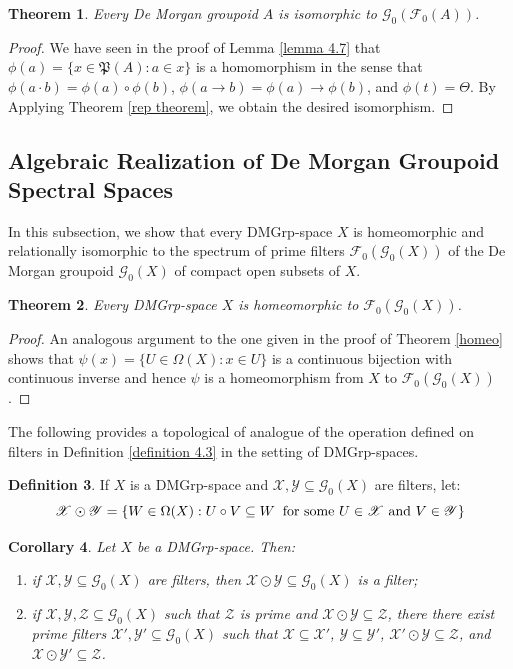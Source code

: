 \documentclass{amsart}
\theoremstyle{plain}
\newtheorem{theorem}{Theorem}[section]
\newtheorem{corollary}[theorem]{Corollary}
\theoremstyle{definition}
\newtheorem{definition}[theorem]{Definition}
\begin{document}
\begin{theorem}
    Every De Morgan groupoid $A$ is isomorphic to $\mathcal{G}_0(\mathcal{F}_0(A))$. 
\end{theorem}
\begin{proof}
    We have seen in the proof of Lemma \ref{lemma 4.7} that $\phi(a)=\{x\in\mathfrak{P}(A):a\in x\}$ is a homomorphism in the sense that
    $\phi(a\cdot b)=\phi(a)\circ\phi(b)$, $\phi(a\rightarrow b)=\phi(a)\rightarrow\phi(b)$, and $\phi(t)=\Theta$. By Applying Theorem \ref{rep theorem}, we obtain the desired isomorphism. 
\end{proof}
\subsection{Algebraic Realization of De Morgan Groupoid Spectral Spaces} In this subsection, we show that every DMGrp-space $X$ is homeomorphic and relationally isomorphic to the spectrum of prime filters $\mathcal{F}_0(\mathcal{G}_0(X))$ of the De Morgan groupoid $\mathcal{G}_0(X)$ of compact open subsets of $X$. 
\begin{theorem}
    Every DMGrp-space $X$ is homeomorphic to $\mathcal{F}_0(\mathcal{G}_0(X))$.  
\end{theorem}
\begin{proof}
    An analogous argument to the one given in the proof of Theorem \ref{homeo} shows that $\psi(x)=\{U\in\Omega(X):x\in U\}$ is a continuous bijection with continuous inverse and hence $\psi$ is a homeomorphism from $X$ to $\mathcal{F}_0(\mathcal{G}_0(X))$.
\end{proof}
The following provides a topological of analogue of the operation defined on filters in Definition \ref{definition 4.3} in the setting of DMGrp-spaces. 
\begin{definition}
If $X$ is a DMGrp-space and $\mathscr{X},\mathscr{Y}\subseteq\mathcal{G}_0(X)$ are filters, let: 
\[\mathscr{X}\odot\mathscr{Y}=\{W\in\Omega(X):U\circ V\subseteq W\hspace{.2cm}\text{for some $U\in\mathscr{X}$ and $V\in\mathscr{Y}$}\}\]
\end{definition}
\begin{corollary}
    Let $X$ be a DMGrp-space. Then: 
\begin{enumerate}
    \item   if $\mathscr{X},\mathscr{Y}\subseteq\mathcal{G}_0(X)$ are filters, then $\mathscr{X}\odot\mathscr{Y}\subseteq\mathcal{G}_0(X)$ is a filter;  
    \item if $\mathscr{X},\mathscr{Y},\mathscr{Z}\subseteq\mathcal{G}_0(X)$ such that $\mathscr{Z}$ is prime and $\mathscr{X}\odot\mathscr{Y}\subseteq\mathscr{Z}$, there there exist prime filters $\mathscr{X}',\mathscr{Y}'\subseteq\mathcal{G}_0(X)$ such that $\mathscr{X}\subseteq\mathscr{X}'$, $\mathscr{Y}\subseteq\mathscr{Y}'$, $\mathscr{X}'\odot\mathscr{Y}\subseteq\mathscr{Z}$, and $\mathscr{X}\odot\mathscr{Y}'\subseteq\mathscr{Z}$.   
\end{enumerate}
 \end{corollary}
\end{document}
